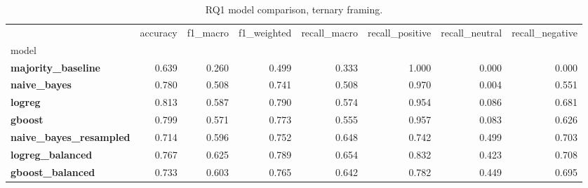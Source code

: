\begin{table}
\caption{RQ1 model comparison, ternary framing.}
\label{tab:rq1_ternary}
\begin{tabular}{lrrrrrrr}
\toprule
 & accuracy & f1_macro & f1_weighted & recall_macro & recall_positive & recall_neutral & recall_negative \\
model &  &  &  &  &  &  &  \\
\midrule
\textbf{majority_baseline} & 0.639 & 0.260 & 0.499 & 0.333 & 1.000 & 0.000 & 0.000 \\
\textbf{naive_bayes} & 0.780 & 0.508 & 0.741 & 0.508 & 0.970 & 0.004 & 0.551 \\
\textbf{logreg} & 0.813 & 0.587 & 0.790 & 0.574 & 0.954 & 0.086 & 0.681 \\
\textbf{gboost} & 0.799 & 0.571 & 0.773 & 0.555 & 0.957 & 0.083 & 0.626 \\
\textbf{naive_bayes_resampled} & 0.714 & 0.596 & 0.752 & 0.648 & 0.742 & 0.499 & 0.703 \\
\textbf{logreg_balanced} & 0.767 & 0.625 & 0.789 & 0.654 & 0.832 & 0.423 & 0.708 \\
\textbf{gboost_balanced} & 0.733 & 0.603 & 0.765 & 0.642 & 0.782 & 0.449 & 0.695 \\
\bottomrule
\end{tabular}
\end{table}
